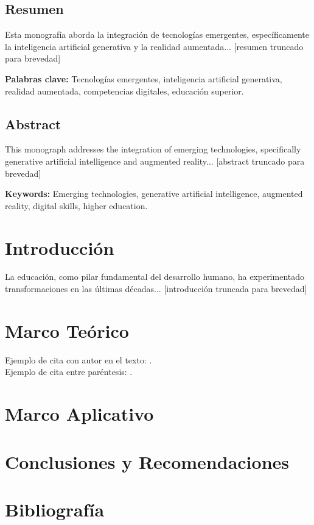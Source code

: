 \documentclass[11pt,oneside,letterpaper]{book}
\begin{document}
	\newpage
	\thispagestyle{empty}
	\renewcommand{\contentsname}{ÍNDICE}
	\tableofcontents

	\newpage
	\section*{Resumen}
	Esta monografía aborda la integración de tecnologías emergentes, específicamente la inteligencia artificial generativa y la realidad aumentada... [resumen truncado para brevedad]

	\textbf{Palabras clave:} Tecnologías emergentes, inteligencia artificial generativa, realidad aumentada, competencias digitales, educación superior.


	\newpage
	\section*{Abstract}
	This monograph addresses the integration of emerging technologies, specifically generative artificial intelligence and augmented reality... [abstract truncado para brevedad]

	\textbf{Keywords:} Emerging technologies, generative artificial intelligence, augmented reality, digital skills, higher education.

	\newpage
	\chapter{Introducción}
	La educación, como pilar fundamental del desarrollo humano, ha experimentado transformaciones en las últimas décadas... [introducción truncada para brevedad]

	\chapter{Marco Teórico}
	\lipsum[1-2]
	Ejemplo de cita con autor en el texto: \textcite{perez2021educacion}.\\
	Ejemplo de cita entre paréntesis: \parencite{smith2020ai}.

	\chapter{Marco Aplicativo}
	\lipsum[1-2]

	\chapter{Conclusiones y Recomendaciones}
	\lipsum[1-2]

	\chapter{Bibliografía}
	\lipsum[1]
	\printbibliography
\end{document}
